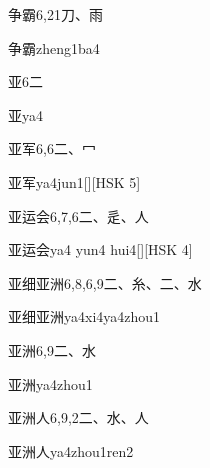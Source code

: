 \begin{entry}{争霸}{6,21}{⼑、⾬}
  \begin{phonetics}{争霸}{zheng1ba4}
  \end{phonetics}
\end{entry}

\begin{entry}{亚}{6}{⼆}
  \begin{phonetics}{亚}{ya4}
  \end{phonetics}
\end{entry}

\begin{entry}{亚军}{6,6}{⼆、⼍}
  \begin{phonetics}{亚军}{ya4jun1}[][HSK 5]
  \end{phonetics}
\end{entry}

\begin{entry}{亚运会}{6,7,6}{⼆、⾡、⼈}
  \begin{phonetics}{亚运会}{ya4 yun4 hui4}[][HSK 4]
  \end{phonetics}
\end{entry}

\begin{entry}{亚细亚洲}{6,8,6,9}{⼆、⽷、⼆、⽔}
  \begin{phonetics}{亚细亚洲}{ya4xi4ya4zhou1}
  \end{phonetics}
\end{entry}

\begin{entry}{亚洲}{6,9}{⼆、⽔}
  \begin{phonetics}{亚洲}{ya4zhou1}
  \end{phonetics}
\end{entry}

\begin{entry}{亚洲人}{6,9,2}{⼆、⽔、⼈}
  \begin{phonetics}{亚洲人}{ya4zhou1ren2}
  \end{phonetics}
\end{entry}


